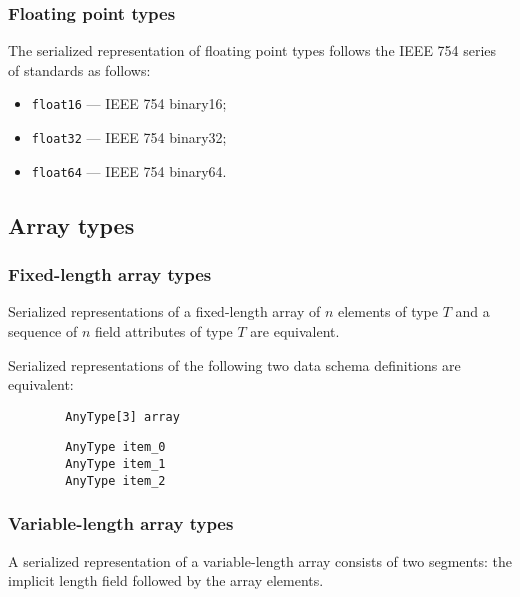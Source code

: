 \subsubsection{Floating point types}

The serialized representation of floating point types follows the IEEE 754 series of standards as follows:

\begin{itemize}
    \item \verb|float16| --- IEEE 754 binary16;
    \item \verb|float32| --- IEEE 754 binary32;
    \item \verb|float64| --- IEEE 754 binary64.
\end{itemize}

\subsection{Array types}

\subsubsection{Fixed-length array types}

Serialized representations of a fixed-length array of $n$ elements of type $T$ and
a sequence of $n$ field attributes of type $T$ are equivalent.

\begin{remark}
    Serialized representations of the following two data schema definitions are equivalent:

    \begin{verbatim}
        AnyType[3] array
    \end{verbatim}

    \begin{verbatim}
        AnyType item_0
        AnyType item_1
        AnyType item_2
    \end{verbatim}
\end{remark}

\subsubsection{Variable-length array types}

A serialized representation of a variable-length array consists of two segments:
the implicit length field followed by the array elements.

